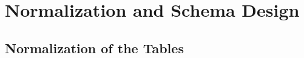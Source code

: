 \chapter[NF and Schema]{Normalization and Schema Design}
\hrulefill

\section{Normalization of the Tables}
\vspace{1cm}



\clearpage

